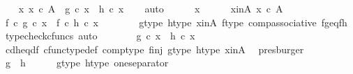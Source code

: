 \begin{isabellebody}
\isanewline
\ \ \isamarkupfalse%
\ {\isachardoublequoteopen}{\isasymforall}x{\isachardot}{\kern0pt}\ x\ {\isasymin}\isactrlsub c\ A\ {\isasymlongrightarrow}\ g\ {\isasymcirc}\isactrlsub c\ x\ {\isacharequal}{\kern0pt}\ h\ {\isasymcirc}\isactrlsub c\ x{\isachardoublequoteclose}\isanewline
\ \ \isamarkupfalse%
\ auto\isanewline
\ \ \ \ \isamarkupfalse%
\ x\isanewline
\ \ \ \ \isamarkupfalse%
\ x{\isacharunderscore}{\kern0pt}in{\isacharunderscore}{\kern0pt}A{\isacharcolon}{\kern0pt}\ {\isachardoublequoteopen}x\ {\isasymin}\isactrlsub c\ A{\isachardoublequoteclose}\isanewline
\isanewline
\ \ \ \ \isamarkupfalse%
\ {\isachardoublequoteopen}f\ {\isasymcirc}\isactrlsub c\ g\ {\isasymcirc}\isactrlsub c\ x\ {\isacharequal}{\kern0pt}\ f\ {\isasymcirc}\isactrlsub c\ h\ {\isasymcirc}\isactrlsub c\ x{\isachardoublequoteclose}\isanewline
\ \ \ \ \ \ \isamarkupfalse%
\ g{\isacharunderscore}{\kern0pt}type\ h{\isacharunderscore}{\kern0pt}type\ x{\isacharunderscore}{\kern0pt}in{\isacharunderscore}{\kern0pt}A\ f{\isacharunderscore}{\kern0pt}type\ comp{\isacharunderscore}{\kern0pt}associative{}\ fg{\isacharunderscore}{\kern0pt}eq{\isacharunderscore}{\kern0pt}fh\ \isamarkupfalse%
\ {\isacharparenleft}{\kern0pt}typecheck{\isacharunderscore}{\kern0pt}cfuncs{\isacharcomma}{\kern0pt}\ auto{\isacharparenright}{\kern0pt}\isanewline
\ \ \ \ \isamarkupfalse%
\ \isamarkupfalse%
\ {\isachardoublequoteopen}g\ {\isasymcirc}\isactrlsub c\ x\ {\isacharequal}{\kern0pt}\ h\ {\isasymcirc}\isactrlsub c\ x{\isachardoublequoteclose}\isanewline
\ \ \ \ \ \ \isamarkupfalse%
\ cd{\isacharunderscore}{\kern0pt}h{\isacharunderscore}{\kern0pt}eq{\isacharunderscore}{\kern0pt}d{\isacharunderscore}{\kern0pt}f\ cfunc{\isacharunderscore}{\kern0pt}type{\isacharunderscore}{\kern0pt}def\ comp{\isacharunderscore}{\kern0pt}type\ f{\isacharunderscore}{\kern0pt}inj\ g{\isacharunderscore}{\kern0pt}type\ h{\isacharunderscore}{\kern0pt}type\ x{\isacharunderscore}{\kern0pt}in{\isacharunderscore}{\kern0pt}A\ \isamarkupfalse%
\ presburger\isanewline
\ \ \isamarkupfalse%
\isanewline
\ \ \isamarkupfalse%
\ \isamarkupfalse%
\ {\isachardoublequoteopen}g\ {\isacharequal}{\kern0pt}\ h{\isachardoublequoteclose}\isanewline
\ \ \ \ \isamarkupfalse%
\ g{\isacharunderscore}{\kern0pt}type\ h{\isacharunderscore}{\kern0pt}type\ one{\isacharunderscore}{\kern0pt}separator\ \isamarkupfalse%

\end{isabellebody}
